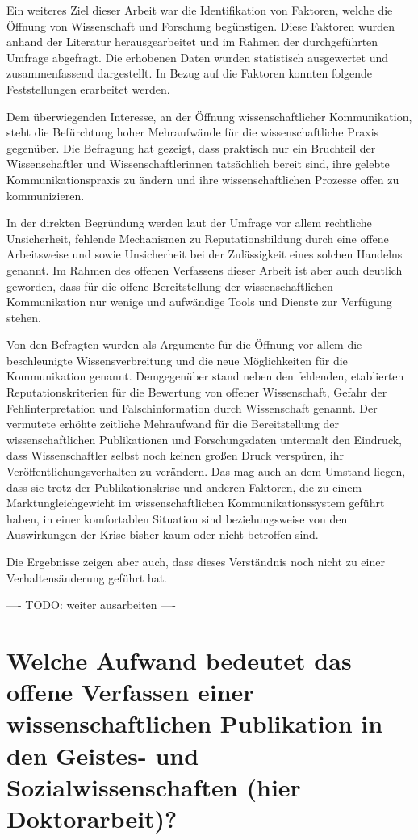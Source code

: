 Ein weiteres Ziel dieser Arbeit war die Identifikation von Faktoren, welche die Öffnung von Wissenschaft und Forschung begünstigen. Diese Faktoren wurden anhand der Literatur herausgearbeitet und im Rahmen der durchgeführten Umfrage abgefragt. Die erhobenen Daten wurden statistisch ausgewertet und zusammenfassend dargestellt. In Bezug auf die Faktoren konnten folgende Feststellungen erarbeitet werden.

Dem überwiegenden Interesse, an der Öffnung wissenschaftlicher Kommunikation, steht die Befürchtung hoher Mehraufwände für die wissenschaftliche Praxis gegenüber. Die Befragung hat gezeigt, dass praktisch nur ein Bruchteil der Wissenschaftler und Wissenschaftlerinnen tatsächlich bereit sind, ihre gelebte Kommunikationspraxis zu ändern und ihre wissenschaftlichen Prozesse offen zu kommunizieren.

In der direkten Begründung werden laut der Umfrage vor allem rechtliche Unsicherheit, fehlende Mechanismen zu Reputationsbildung durch eine offene Arbeitsweise und sowie Unsicherheit bei der Zulässigkeit eines solchen Handelns genannt. Im Rahmen des offenen Verfassens dieser Arbeit ist aber auch deutlich geworden, dass für die offene Bereitstellung der wissenschaftlichen Kommunikation nur wenige und aufwändige Tools und Dienste zur Verfügung stehen.

Von den Befragten wurden als Argumente für die Öffnung vor allem die beschleunigte Wissensverbreitung und die neue Möglichkeiten für die Kommunikation genannt. Demgegenüber stand neben den fehlenden, etablierten Reputationskriterien für die Bewertung von offener Wissenschaft, Gefahr der Fehlinterpretation und Falschinformation durch Wissenschaft genannt. Der vermutete erhöhte zeitliche Mehraufwand für die Bereitstellung der wissenschaftlichen Publikationen und Forschungsdaten untermalt den Eindruck, dass Wissenschaftler selbst noch keinen großen Druck verspüren, ihr Veröffentlichungsverhalten zu verändern. Das mag auch an dem Umstand liegen, dass sie trotz der Publikationskrise und anderen Faktoren, die zu einem Marktungleichgewicht im wissenschaftlichen Kommunikationssystem geführt haben, in einer komfortablen Situation sind beziehungsweise von den Auswirkungen der Krise bisher kaum oder nicht betroffen sind.

Die Ergebnisse zeigen aber auch, dass dieses Verständnis noch nicht zu einer Verhaltensänderung geführt hat.

---- TODO: weiter ausarbeiten ----

\section{Welche Aufwand bedeutet das offene Verfassen einer wissenschaftlichen Publikation in den Geistes- und Sozialwissenschaften (hier Doktorarbeit)?}

